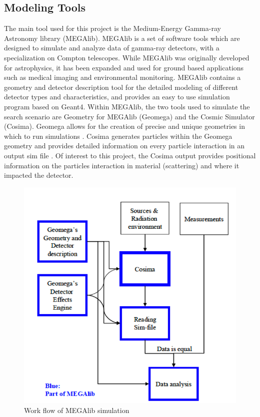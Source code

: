 \subsection{Modeling Tools}
\noindent The main tool used for this project is the Medium-Energy Gamma-ray Astronomy library (MEGAlib). MEGAlib is a set of software tools which are designed to simulate and analyze data of gamma-ray detectors, with a specialization on Compton telescopes. While MEGAlib was originally developed for astrophysics, it has been expanded and used for ground based applications such as medical imaging and environmental monitoring. MEGAlib contains a geometry and detector description tool for the detailed modeling of different detector types and characteristics, and provides an easy to use simulation program based on Geant4. Within MEGAlib, the two tools used to simulate the search scenario are Geometry for MEGAlib (Geomega) and the Cosmic Simulator (Cosima). Geomega allows for the creation of precise and unique geometries in which to run simulations \cite{cosima}. Cosima generates particles within the Geomega geometry and provides detailed information on every particle interaction in an output sim file \cite{cosima}. Of interest to this project, the Cosima output provides positional information on the particles interaction in material (scattering) and where it impacted the detector.

\begin{figure}[!htb]
  \centering
  \includegraphics[width=\columnwidth]{images/MEGAlib}
  \caption{Work flow of MEGAlib simulation}
  \label{fig:MEGAlib}
\end{figure}

